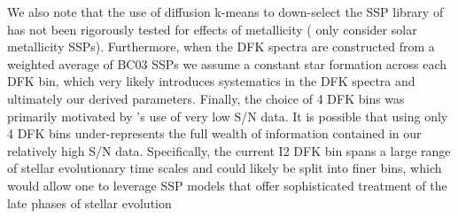 We also note that the use of diffusion k-means to down-select the SSP
library of \citet{Bruzual03} has not been rigorously tested for
effects of metallicity ( only consider solar
metallicity SSPs). Furthermore, when the DFK spectra are constructed
from a weighted average of BC03 SSPs we assume a constant star
formation across each DFK bin, which very likely introduces
systematics in the DFK spectra and ultimately our derived
parameters. Finally, the choice of 4 DFK bins was primarily motivated
by 's use of very low S/N data. It is possible
that using only 4 DFK bins under-represents the full wealth of
information contained in our relatively high S/N data. Specifically,
the current I2 DFK bin spans a large range of stellar evolutionary
time scales and could likely be split into finer bins, which would
allow one to leverage SSP models that offer sophisticated treatment of
the late phases of stellar evolution 



